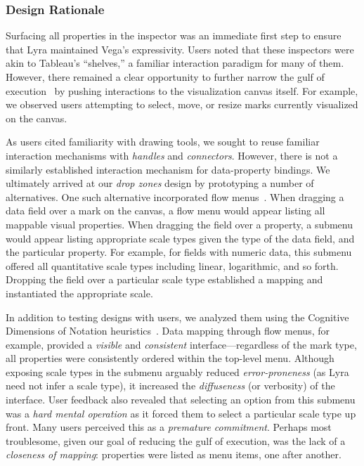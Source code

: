 \vspace{-10pt}

\subsubsection{Design Rationale}

\vspace{-10pt}

Surfacing all properties in the inspector was an immediate first step to ensure
that Lyra maintained Vega's expressivity. Users noted that these inspectors were
akin to Tableau's ``shelves,'' a familiar interaction paradigm for many of them.
However, there remained a clear opportunity to further narrow the gulf of
execution~\cite{hutchins:directmanip} by pushing interactions to the
visualization canvas itself. For example, we observed users attempting to
select, move, or resize marks currently visualized on the canvas.

As users cited familiarity with drawing tools, we sought to reuse familiar
interaction mechanisms with \emph{handles} and \emph{connectors}. However, there
is not a similarly established interaction mechanism for data-property bindings.
We ultimately arrived at our \emph{drop zones} design by prototyping a number of
alternatives. One such alternative incorporated flow
menus~\cite{guimbretiere:flowmenu}. When dragging a data field over a mark on
the canvas, a flow menu would appear listing all mappable visual properties.
When dragging the field over a property, a submenu would appear listing
appropriate scale types given the type of the data field, and the particular
property. For example, for fields with numeric data, this submenu offered all
quantitative scale types including linear, logarithmic, and so forth. Dropping
the field over a particular scale type established a mapping and instantiated
the appropriate scale.

In addition to testing designs with users, we analyzed them using the Cognitive
Dimensions of Notation heuristics~\cite{blackwell:cogdim}. Data mapping through
flow menus, for example, provided a \emph{visible} and \emph{consistent}
interface---regardless of the mark type, all properties were consistently
ordered within the top-level menu. Although exposing scale types in the submenu
arguably reduced \emph{error\--proneness} (as Lyra need not infer a scale type),
it increased the \emph{diffuseness} (or verbosity) of the interface. User
feedback also revealed that selecting an option from this submenu was a
\emph{hard mental operation} as it forced them to select a particular scale type
up front. Many users perceived this as a \emph{premature commitment}. Perhaps
most troublesome, given our goal of reducing the gulf of execution, was the lack
of a \emph{closeness of mapping}: properties were listed as menu items, one
after another.

